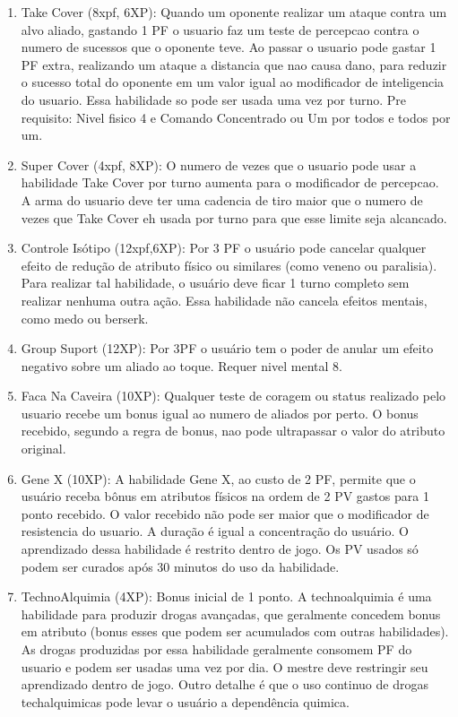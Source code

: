 \begin{enumerate}
 	\item Take Cover (8xpf, 6XP): Quando um oponente realizar um ataque contra um alvo aliado, gastando 1 PF o usuario faz um teste de percepcao contra o numero de sucessos que o oponente teve. Ao passar o usuario pode gastar 1 PF extra, realizando um ataque a distancia que nao causa dano, para reduzir o sucesso total do oponente em um valor igual ao modificador de inteligencia do usuario. Essa habilidade so pode ser usada uma vez por turno. Pre requisito: Nivel fisico 4 e Comando Concentrado ou Um por todos e todos por um.
 	
 	\item Super Cover (4xpf, 8XP): O numero de vezes que o usuario pode usar a habilidade Take Cover por turno aumenta para o modificador de percepcao. A arma do usuario deve ter uma cadencia de tiro maior que o numero de vezes que Take Cover eh usada por turno para que esse limite seja alcancado.

	\item Controle Isótipo (12xpf,6XP): Por 3 PF o usuário pode cancelar qualquer efeito de redução de atributo físico ou similares (como veneno ou paralisia). Para realizar tal habilidade, o usuário deve ficar 1 turno completo sem realizar nenhuma outra ação. Essa habilidade não cancela efeitos mentais, como medo ou berserk.
	
	\item Group Suport (12XP): Por 3PF o usuário tem o poder de anular um efeito negativo sobre um aliado ao toque. Requer nivel mental 8.

    \item Faca Na Caveira (10XP): Qualquer teste de coragem ou status realizado pelo usuario recebe um bonus igual ao numero de aliados por perto. O bonus recebido, segundo a regra de bonus, nao pode ultrapassar o valor do atributo original.
	
	\item Gene X (10XP): A habilidade Gene X, ao custo de 2 PF, permite que o usuário receba bônus em atributos físicos na ordem de 2 PV gastos para 1 ponto recebido. O valor recebido não pode ser maior que o modificador de resistencia do usuario. A duração é igual a concentração do usuário. O aprendizado dessa habilidade é restrito dentro de jogo. Os PV usados só podem ser curados após 30 minutos do uso da habilidade.
	
	\item TechnoAlquimia (4XP): Bonus inicial de 1 ponto. A technoalquimia é uma habilidade para produzir drogas avançadas, que geralmente concedem bonus em atributo (bonus esses que podem ser acumulados com outras habilidades). As drogas produzidas por essa habilidade geralmente consomem PF do usuario e podem ser usadas uma vez por dia. O mestre deve restringir seu aprendizado dentro de jogo. Outro detalhe é que o uso continuo de drogas techalquimicas pode levar o usuário a dependência quimica. 
     

\end{enumerate}
